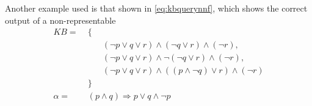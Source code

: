 Another example used is that shown in \ref{eq:kbquerynnf}, which shows the
correct output of a non-representable
\begin{align}
\label{eq:kbquerycnf}
    KB =& \; \{\\
        & \qquad (\neg p \vee q \vee r)\wedge(\neg q \vee r)\wedge(\neg r),\\
        & \qquad (\neg p \vee q \vee r)\wedge\neg (\neg q \vee r)\wedge(\neg r),\\
        & \qquad (\neg p \vee q \vee r)\wedge((p\wedge\neg q) \vee r)\wedge(\neg r)\\
        & \; \}\\
\alpha =& \; (p \wedge q) \Rightarrow p \vee q \wedge \neg p
\end{align}







